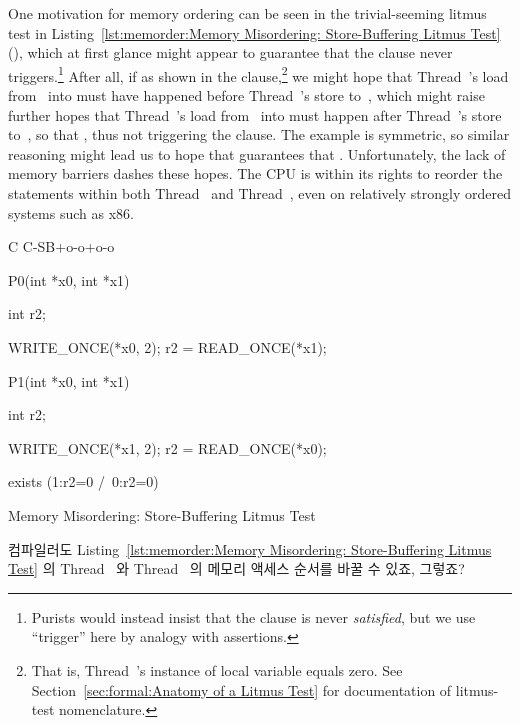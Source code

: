 One motivation for memory ordering can be seen in the trivial-seeming
litmus test in
Listing~\ref{lst:memorder:Memory Misordering: Store-Buffering Litmus Test}
(),
which at first glance might
appear to guarantee that the  clause never triggers.\footnote{
	Purists would instead insist that the  clause is
	never \emph{satisfied}, but we use ``trigger'' here by
	analogy with assertions.}
After all, if  as shown in the  clause,\footnote{
	That is, Thread~'s instance of local variable 
	equals zero.
	See Section~\ref{sec:formal:Anatomy of a Litmus Test}
	for documentation of litmus-test nomenclature.}
we might hope that Thread~'s load from~ into 
must have happened before Thread~'s store to~, which
might raise further hopes that Thread~'s load from~
into  must happen after Thread~'s store to~,
so that , thus not triggering the  clause.
The example is symmetric, so similar reasoning might lead
us to hope that  guarantees that .
Unfortunately, the lack of memory barriers dashes these hopes.
The CPU is within its rights to reorder
the statements within both Thread~ and Thread~,
even on relatively strongly ordered systems such as x86.
\fi

\begin{listing}[tbp]
{ \scriptsize
\begin{verbbox}[\LstLineNo]
C C-SB+o-o+o-o
{
}

P0(int *x0, int *x1)
{
  int r2;

  WRITE_ONCE(*x0, 2);
  r2 = READ_ONCE(*x1);
}


P1(int *x0, int *x1)
{
  int r2;

  WRITE_ONCE(*x1, 2);
  r2 = READ_ONCE(*x0);
}

exists (1:r2=0 /\ 0:r2=0)
\end{verbbox}
}
\centering
\theverbbox
\caption{Memory Misordering: Store-Buffering Litmus Test}
\label{lst:memorder:Memory Misordering: Store-Buffering Litmus Test}
\end{listing}

\QuickQuiz{}
	컴파일러도
	Listing~\ref{lst:memorder:Memory Misordering: Store-Buffering Litmus Test}
	의 Thread~ 와 Thread~ 의 메모리 액세스 순서를 바꿀 수
	있죠, 그렇죠?
	\iffalse

